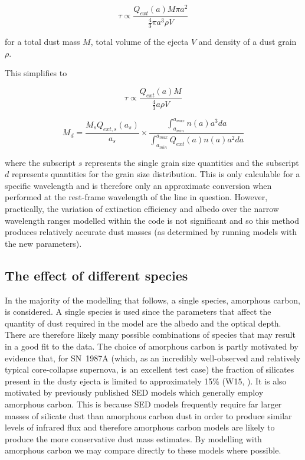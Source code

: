 \begin{equation}
\tau \propto \frac{Q_{ext}(a) M \pi a^2}{\frac{4}{3} \pi a^3 \rho V}
\end{equation}

\noindent for a total dust mass $M$, total volume of the ejecta $V$ and density of a dust grain $\rho$.

This simplifies to 

\begin{equation}
\tau \propto \frac{Q_{ext}(a) M}{\frac{4}{3} a \rho V}
\end{equation}

\begin{equation}
\label{distn_conv}
M_{d}= \frac{M_s Q_{ext,s}(a_s)}{a_s} \times \frac{\int^{a_{max}}_{a_{min}} n(a) a^3 da}{\int^{a_{max}}_{a_{min}} Q_{ext}(a) n(a) a^2 da}
\end{equation}

where the subscript $s$ represents the single grain size quantities and the subscript  $d$ represents quantities for the grain size distribution.  This is only calculable for a specific wavelength and is therefore only an approximate conversion when performed at the rest-frame wavelength of the line in question.  However, practically, the variation of extinction efficiency and albedo over the narrow wavelength ranges modelled within the code is not significant and so this method produces relatively accurate dust masses (as determined by running models with the new parameters).

\subsection{The effect of different species}

In the majority of the modelling that follows, a single species, amorphous carbon, is considered.   A single species is used since the parameters that affect the quantity of dust required in the model are the albedo and the optical depth.  There are therefore  likely many possible combinations of species that may result in a good fit to the data.  The choice of amorphous carbon is partly motivated by evidence that, for SN~1987A (which, as an incredibly well-observed and relatively typical core-collapse supernova, is an excellent test case) the fraction of silicates present in the dusty ejecta is limited to approximately 15\% (W15, \citet{Ercolano2007}).  It is also motivated by previously published SED models which generally employ amorphous carbon.  This is because SED models frequently require far larger masses of silicate dust than amorphous carbon dust in order to produce similar levels of infrared flux and therefore amorphous carbon models are likely to produce the more conservative dust mass estimates.  By modelling with amorphous carbon we may compare directly to these models where possible.

